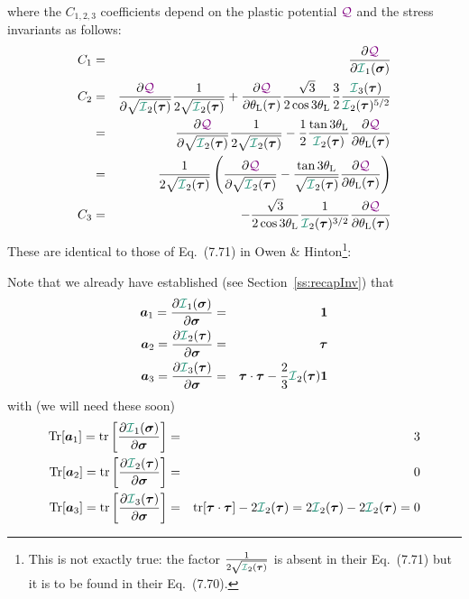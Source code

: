 where the $C_{1,2,3}$ coefficients depend on the plastic potential ${\color{violet}\cal Q}$
and the stress invariants as follows:
\begin{eqnarray}
C_1 &=&  \frac{\partial \QQQ}{\partial {\III}_1(\bm\sigma)} \\
C_2 
&=& \frac{\partial \QQQ}{\partial \sqrt{{\III}_2(\bm\tau)}} 
\frac{1}{2 \sqrt{ {\III}_2(\bm\tau)}   }   
+
\frac{\partial \QQQ}{\partial \theta_{\rm L}(\bm\tau)} 
\frac{\sqrt{3}}{2\cos 3\theta_{\rm L}}
\frac32  \frac{ {\III}_3(\bm\tau)   }{ {\III}_2(\bm\tau)^{5/2}} \nn\\
&=& 
\frac{\partial \QQQ}{\partial \sqrt{{\III}_2(\bm\tau)}} 
\frac{1}{2 \sqrt{ {\III}_2(\bm\tau)}   }   
-
\frac12
\frac{\tan 3\theta_{\rm L}}{ {\III}_2(\bm\tau)}
\frac{\partial \QQQ}{\partial \theta_{\rm L}(\bm\tau)}  \nn\\
&=& 
\frac{1}{2 \sqrt{ {\III}_2(\bm\tau)}   }   
\left(
\frac{\partial \QQQ}{\partial \sqrt{{\III}_2(\bm\tau)}} 
-
\frac{\tan 3\theta_{\rm L}}{\sqrt {{\III}_2(\bm\tau)}}
\frac{\partial \QQQ}{\partial \theta_{\rm L}(\bm\tau)}  
\right) \nn
\\
C_3 &=&  
-
\frac{\sqrt{3}}{2\cos 3\theta_{\rm L}}
\frac{1}{{\III}_2(\bm\tau)^{3/2}} 
\frac{\partial \QQQ}{\partial \theta_{\rm L}(\bm\tau)} 
\end{eqnarray}
These are identical to those of Eq.~(7.71) in Owen \& Hinton\footnote{This is 
not exactly true: the factor  $\frac{1}{2 \sqrt{ {\III}_2(\bm\tau)} }$
is absent in their Eq.~(7.71) but it is to be found in their Eq.~(7.70).}:
\begin{center}
\end{center}

\noindent Note that we already have established (see Section~\ref{ss:recapInv}) that  
\begin{eqnarray}
{\bm a}_1 =\frac{\partial {\III}_1(\bm\sigma)}{\partial \bm\sigma} &=& {\bm 1} \nn\\
{\bm a}_2 =\frac{\partial {\III}_2(\bm\tau)}{\partial \bm\sigma} &=& {\bm \tau} \nn\\
{\bm a}_3 =\frac{\partial {\III}_3(\bm\tau)}{\partial \bm\sigma} 
&=& \bm\tau\cdot\bm\tau -\frac23  {\III}_2(\bm\tau){\bm 1} \nn
\end{eqnarray}
with (we will need these soon)
\begin{eqnarray}
\textrm{Tr}[{\bm a}_1]=
{\rm tr}\left[ \frac{\partial {\III}_1(\bm\sigma)}{\partial \bm\sigma} \right] &=& 3 \\  
\textrm{Tr}[{\bm a}_2]=
{\rm tr}\left[ \frac{\partial {\III}_2(\bm\tau)}{\partial \bm\sigma}   \right] &=& 0 \\
\textrm{Tr}[{\bm a}_3]=
{\rm tr}\left[ \frac{\partial {\III}_3(\bm\tau)}{\partial \bm\sigma}   \right] &=& 
{\rm tr}[\bm\tau\cdot\bm\tau] - 2  {\III}_2(\bm\tau) = 2  {\III}_2(\bm\tau) -2  {\III}_2(\bm\tau) = 0 
\end{eqnarray}

